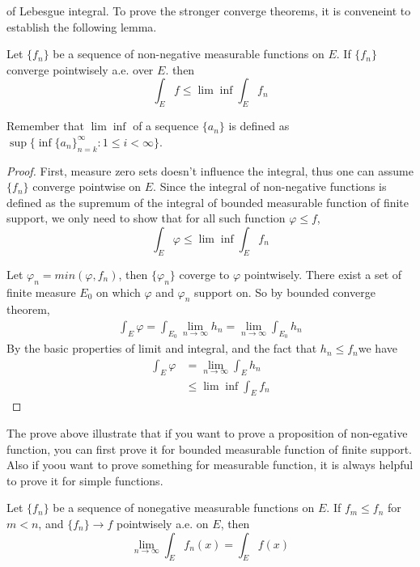 \documentclass[lang=en, 12pt]{elegantbook}
\begin{document}
    of Lebesgue integral. To prove the stronger converge theorems, it is conveneint to establish the following lemma.
    \begin{lemma}
        Let $\{f_n\}$ be a sequence of non-negative measurable functions on $E$. If $\{f_n\}$ converge pointwisely a.e. over $E$.
    then 
    $$\int_E f \leq \lim \inf \int_E f_n$$
    \end{lemma}
    Remember that $\lim \inf $ of a sequence $\{a_n\}$ is defined as $\sup \{\inf \{a_n\}_{n=k}^{\infty} : 1\leq i < \infty \}$.
    \begin{proof}
        First, measure zero sets doesn't influence the integral, thus one can assume $\{f_n\}$ converge pointwise on $E$.
    Since the integral of non-negative functions is defined as the supremum of the integral of bounded measurable function of finite 
    support, we only need to show that for all such function $\varphi \leq f$, 
    $$\int_E \varphi \leq \lim \inf \int_E f_n$$\par
        Let $\varphi_n = min(\varphi, f_n)$, then $\{\varphi_n\}$ coverge to $\varphi$ pointwisely. There exist a set of finite measure 
    $E_0$ on which $\varphi$ and $\varphi_n$ support on. So by bounded converge theorem,
    \begin{equation*}
        \begin{aligned}
            \int_E \varphi = \int_{E_0} \lim_{n \to \infty} h_n = \lim_{n \to \infty} \int_{E_0} h_n
        \end{aligned}
    \end{equation*}
    By the basic properties of limit and integral, and the fact that $h_n \leq f_n$we have 
    \begin{equation*}
        \begin{aligned}
            \int_E \varphi &= \lim_{n \to \infty} \int_E h_n\\
            &\leq \lim \inf \int_E f_n
        \end{aligned}
    \end{equation*}
    \end{proof}
        The prove above illustrate that if you want to prove a proposition of non-egative function, you can first prove it for bounded 
    measurable function of finite support. Also if yoou want to prove something for measurable function, it is always helpful to prove it 
    for simple functions. 
    \begin{theorem}
        Let $\{f_n\}$ be a sequence of nonegative measurable functions on $E$. If $f_m \leq f_n$ for $m<n$, and $\{f_n\} \to f$ pointwisely a.e. on
    $E$, then 
    $$\lim_{n \to \infty} \int_E f_n(x) = \int_E f(x) $$
    \end{theorem}
\end{document}
